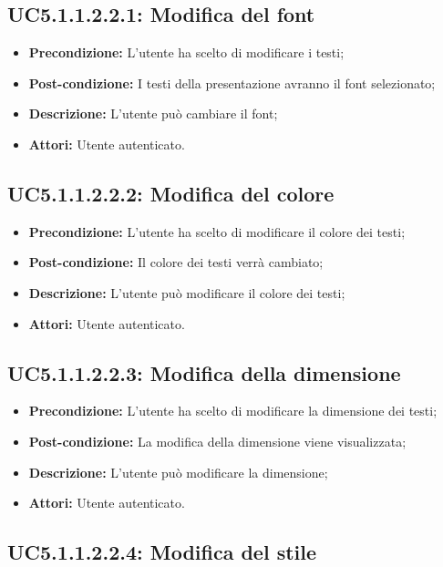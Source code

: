 \subsection{ UC5.1.1.2.2.1: Modifica del font}

\begin{itemize}
	\item \textbf{Precondizione:} L'utente ha scelto di modificare i testi;
	\item \textbf{Post-condizione:} I testi della presentazione avranno il font selezionato;
	\item \textbf{Descrizione:} L'utente può cambiare il font;
	\item \textbf{Attori:} Utente autenticato.
\end{itemize}
\subsection{ UC5.1.1.2.2.2: Modifica del colore}

\begin{itemize}
	\item \textbf{Precondizione:} L'utente ha scelto di modificare il colore dei testi;
	\item \textbf{Post-condizione:} Il colore dei testi verrà cambiato;
	\item \textbf{Descrizione:} L'utente può modificare il colore dei testi;
	\item \textbf{Attori:} Utente autenticato.
\end{itemize}
\subsection{ UC5.1.1.2.2.3: Modifica della dimensione }

\begin{itemize}
	\item \textbf{Precondizione:} L'utente ha scelto di modificare la dimensione dei testi;
	\item \textbf{Post-condizione:} La modifica della dimensione viene visualizzata;
	\item \textbf{Descrizione:} L'utente può modificare la dimensione;
	\item \textbf{Attori:} Utente autenticato.
\end{itemize}
\subsection{ UC5.1.1.2.2.4: Modifica del stile}

